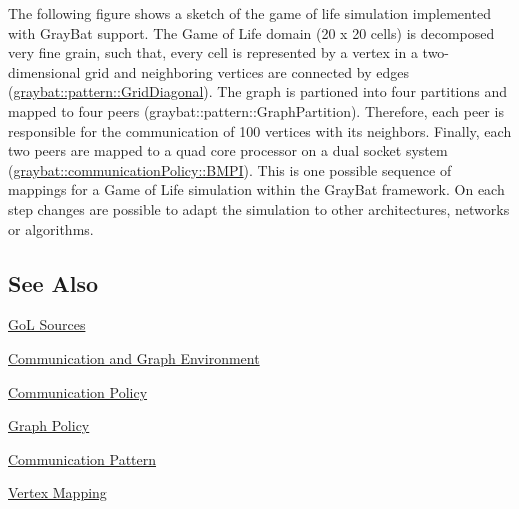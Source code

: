 The following figure shows a sketch of the game of life simulation implemented with Gray\+Bat support. The Game of Life domain (20 x 20 cells) is decomposed very fine grain, such that, every cell is represented by a vertex in a two-\/dimensional grid and neighboring vertices are connected by edges (\hyperlink{structgraybat_1_1pattern_1_1GridDiagonal}{graybat\+::pattern\+::\+Grid\+Diagonal}). The graph is partioned into four partitions and mapped to four peers (graybat\+::pattern\+::\+Graph\+Partition). Therefore, each peer is responsible for the communication of 100 vertices with its neighbors. Finally, each two peers are mapped to a quad core processor on a dual socket system (\hyperlink{structgraybat_1_1communicationPolicy_1_1BMPI}{graybat\+::communication\+Policy\+::\+B\+M\+P\+I}). This is one possible sequence of mappings for a Game of Life simulation within the Gray\+Bat framework. On each step changes are possible to adapt the simulation to other architectures, networks or algorithms.



\subsection*{See Also}


\begin{DoxyItemize}
\item \hyperlink{gol_8cpp-example}{Go\+L Sources}
\item \hyperlink{cage}{Communication and Graph Environment}
\item \hyperlink{communicationPolicy}{Communication Policy}
\item \hyperlink{graphPolicy}{Graph Policy}
\item \hyperlink{communicationPattern}{Communication Pattern}
\item \hyperlink{mapping}{Vertex Mapping} 
\end{DoxyItemize}